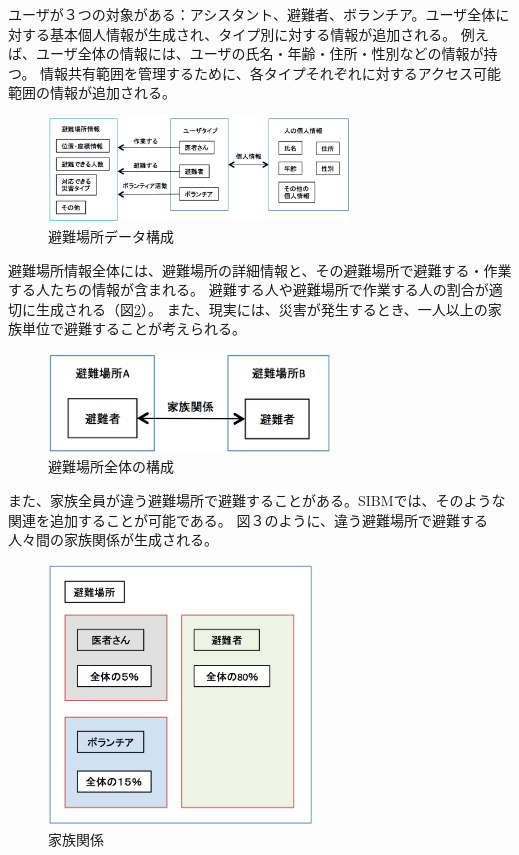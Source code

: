 ユーザが３つの対象がある：アシスタント、避難者、ボランチア。ユーザ全体に対する基本個人情報が生成され、タイプ別に対する情報が追加される。
例えば、ユーザ全体の情報には、ユーザの氏名・年齢・住所・性別などの情報が持つ。
情報共有範囲を管理するために、各タイプそれぞれに対するアクセス可能範囲の情報が追加される。

\begin{figure}[h!]
 	\begin{center}
 		\includegraphics[width=80mm]{./images/fig1.eps}
 		\caption{避難場所データ構成}
 		\label{fig:sibm_structrure}
 	\end{center}
\end{figure}

避難場所情報全体には、避難場所の詳細情報と、その避難場所で避難する・作業する人たちの情報が含まれる。
避難する人や避難場所で作業する人の割合が適切に生成される（図\ref{fig:sibm_shelter}）。
また、現実には、災害が発生するとき、一人以上の家族単位で避難することが考えられる。

\begin{figure}[h!]
 	\begin{center}
 		\includegraphics[width=75mm]{./images/fig2.eps}
 		\caption{避難場所全体の構成}
 		\label{fig:sibm_shelter}
 	\end{center}
\end{figure}

また、家族全員が違う避難場所で避難することがある。SIBMでは、そのような関連を追加することが可能である。
図３のように、違う避難場所で避難する人々間の家族関係が生成される。

\begin{figure}[h!]
 	\begin{center}
 		\includegraphics[width=70mm]{./images/fig4.eps}
 		\caption{家族関係}
 		\label{fig:sibm_relationship}
 	\end{center}
\end{figure}

